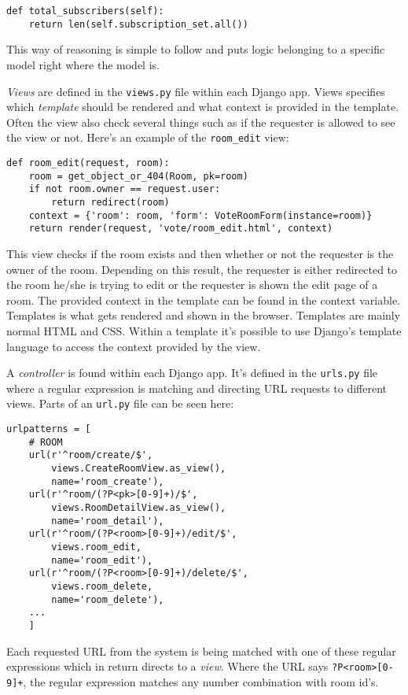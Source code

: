 \begin{verbatim}
def total_subscribers(self):
    return len(self.subscription_set.all())
\end{verbatim}
This way of reasoning is simple to follow and puts logic belonging to a specific model right where the model is.

\emph{Views} are defined in the \texttt{views.py} file within each Django app. Views specifies which \emph{template} should be rendered and what context is provided in the template. Often the view also check several things such as if the requester is allowed to see the view or not. Here's an example of the \texttt{room\_edit} view:

\begin{verbatim}
def room_edit(request, room):
    room = get_object_or_404(Room, pk=room)
    if not room.owner == request.user:
        return redirect(room)
    context = {'room': room, 'form': VoteRoomForm(instance=room)}
    return render(request, 'vote/room_edit.html', context)
\end{verbatim}
This view checks if the room exists and then whether or not the requester is the owner of the room. Depending on this result, the requester is either redirected to the room he/she is trying to edit or the requester is shown the edit page of a room. The provided context in the template can be found in the context variable. Templates is what gets rendered and shown in the browser. Templates are mainly normal HTML and CSS. Within a template it's possible to use Django's template language to access the context provided by the view. 

A \emph{controller} is found within each Django app. It's defined in the \texttt{urls.py} file where a regular expression is matching and directing URL requests to different views. Parts of an \texttt{url.py} file can be seen here:


\begin{verbatim}
urlpatterns = [
    # ROOM
    url(r'^room/create/$', 
        views.CreateRoomView.as_view(), 
        name='room_create'),
    url(r'^room/(?P<pk>[0-9]+)/$', 
        views.RoomDetailView.as_view(), 
        name='room_detail'),
    url(r'^room/(?P<room>[0-9]+)/edit/$', 
        views.room_edit, 
        name='room_edit'),
    url(r'^room/(?P<room>[0-9]+)/delete/$', 
        views.room_delete, 
        name='room_delete'),
    ...
    ]
\end{verbatim}

Each requested URL from the system is being matched with one of these regular expressions which in return directs to a \emph{view}. Where the URL says \texttt{?P<room>[0-9]+}, the regular expression matches any number combination with room id's.

